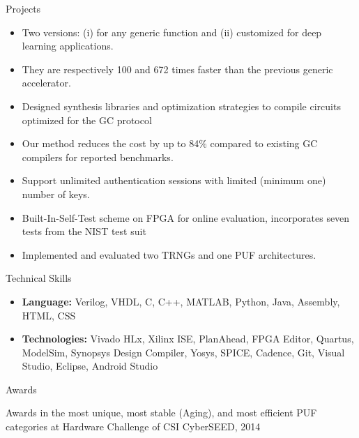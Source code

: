 \begin{cvsection}{Projects}
	\begin{cvsubsection}{}{}{}
		\begin{itemize}
			\item  Two versions: (i) for any generic function and (ii) customized for deep learning applications. 
			\item  They are respectively 100 and 672 times faster than the previous generic accelerator. 
		\end{itemize}
		\begin{itemize}
			\item  Designed synthesis libraries and optimization strategies to compile circuits optimized for the GC protocol
			\item Our method reduces the cost by up to 84$\%$ compared to existing GC compilers for reported benchmarks.
		\end{itemize}
		\begin{itemize}
		    \item Support unlimited authentication sessions with limited (minimum one) number of keys.  
		\end{itemize}
% 			
		\begin{itemize}
		    \item Built-In-Self-Test scheme on FPGA for online evaluation, incorporates seven tests from the NIST test suit 
			\item Implemented and evaluated two TRNGs and one PUF architectures.  
		\end{itemize}
	\end{cvsubsection}
\end{cvsection} 
\begin{cvsection}{Technical Skills}
	\begin{cvsubsection}{}{}{}	
		\begin{itemize}
			\item \textbf{Language:} Verilog, VHDL, C, C++, MATLAB, Python, Java, Assembly, HTML, CSS 
			\vspace{0.3em}
			\item \textbf{Technologies:} Vivado HLx, Xilinx ISE, PlanAhead, FPGA Editor, Quartus, ModelSim, Synopsys Design Compiler, Yosys,  SPICE, Cadence, Git, Visual Studio, Eclipse, Android Studio
		\end{itemize}
	\end{cvsubsection}
\end{cvsection} 
\begin{cvsection}{Awards}
	\begin{cvsubsection}{}{}{}	
		Awards in the most unique, most stable (Aging), and most efficient PUF categories at Hardware Challenge of CSI CyberSEED, 2014
	\end{cvsubsection}
\end{cvsection} 
